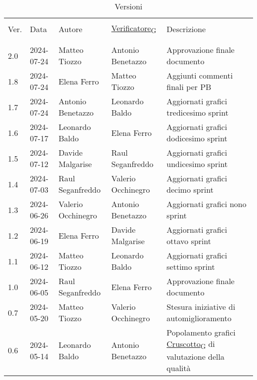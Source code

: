 \documentclass[italian,12pt]{article} %
\begin{document}

\newpage

\captionsetup[table]{list=no}
\begin{table}[!h]
	\caption*{Versioni}
	\footnotesize
	\begin{center}
		\begin{tabular}{ l l l l p{6cm} }
			\hline                                                                                                                   \\[-2ex]
			Ver. & Data       & Autore             & \href{https://7last.github.io/docs/pb/documentazione-interna/glossario\#verificatore}{Verificatore\textsubscript{G}}       & Descrizione                                                \\
			\\[-2ex] \hline \\[-1.5ex]
			2.0  & 2024-07-24 & Matteo Tiozzo      & Antonio Benetazzo  & Approvazione finale documento \\
			1.8  & 2024-07-24 & Elena Ferro        & Matteo Tiozzo      & Aggiunti commenti finali per PB \\
			1.7  & 2024-07-24 & Antonio Benetazzo  & Leonardo Baldo     & Aggiornati grafici tredicesimo sprint \\
			1.6  & 2024-07-17 & Leonardo Baldo     & Elena Ferro        & Aggiornati grafici dodicesimo sprint \\
			1.5  & 2024-07-12 & Davide Malgarise   & Raul Seganfreddo   & Aggiornati grafici undicesimo sprint \\
			1.4  & 2024-07-03 & Raul Seganfreddo   & Valerio Occhinegro & Aggiornati grafici decimo sprint \\
			1.3  & 2024-06-26 & Valerio Occhinegro & Antonio Benetazzo  & Aggiornati grafici nono sprint \\
			1.2  & 2024-06-19 & Elena Ferro        & Davide Malgarise   & Aggiornati grafici ottavo sprint \\
			1.1  & 2024-06-12 & Matteo Tiozzo      & Leonardo Baldo     & Aggiornati grafici settimo sprint \\
			1.0  & 2024-06-05 & Raul Seganfreddo   & Elena Ferro        & Approvazione finale documento                              \\
			0.7  & 2024-05-20 & Matteo Tiozzo      & Valerio Occhinegro & Stesura iniziative di automiglioramento                    \\
			0.6  & 2024-05-14 & Leonardo Baldo     & Antonio Benetazzo  & Popolamento grafici \href{https://7last.github.io/docs/pb/documentazione-interna/glossario\#cruscotto}{Cruscotto\textsubscript{G}} di valutazione della qualità \\

\end{tabular}
\end{center}
\end{table}
\end{document}
